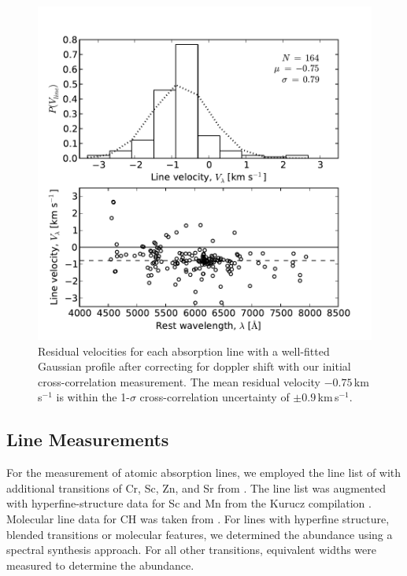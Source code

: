 \documentclass{emulateapj}
\begin{document}
\begin{figure}[h]
	\includegraphics[width=\columnwidth]{./figures/line-velocity.pdf}
	\caption{Residual velocities for each absorption line with a well-fitted Gaussian profile after correcting for  doppler shift with our initial cross-correlation measurement. The mean residual velocity $-0.75$\,km\,s$^{-1}$ is within the 1-$\sigma$ cross-correlation uncertainty of $\pm0.9$\,km\,s$^{-1}$.}
	\label{fig:line-velocities}
\end{figure}


\subsection{Line Measurements}
\label{sec:line-measurements}

For the measurement of atomic absorption lines, we employed the line list of \citet{yong;et-al_2005} with additional transitions of Cr, Sc, Zn, and Sr from \citet{frebel;et-al_2010}. The line list was augmented with hyperfine-structure data for Sc and Mn from the Kurucz compilation \citet{kurucz;1998}. Molecular line data for CH was taken from \citet{plez;et-al_2008,plez;et-al_2009}. For lines with hyperfine structure, blended transitions or molecular features, we determined the abundance using a spectral synthesis approach. For all other transitions, equivalent widths were measured to determine the abundance.
\end{document}
